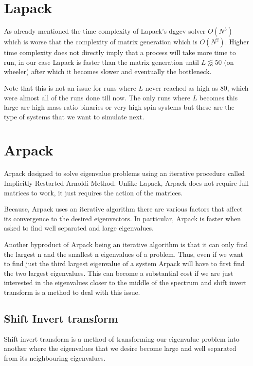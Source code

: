 \documentclass[%
 reprint,
 amsmath,amssymb,
 aps,
]{revtex4-2}
\begin{document}
\section{\label{sec:Lapack} Lapack}

As already mentioned the time complexity of Lapack's dggev solver $O(N^3)$ which is worse that the complexity of matrix generation which is $O(N^2)$. Higher time complexity does not directly imply that a process will take more time to run, in our case Lapack is faster than the matrix generation until $L \lessapprox 50$ (on wheeler) after which it becomes slower and eventually the bottleneck.

Note that this is not an issue for runs where $L$ never reached as high as 80, which were almost all of the runs done till now. The only runs where $L$ becomes this large are high mass ratio binaries or very high spin systems but these are the type of systems that we want to simulate next.

\section{\label{sec:Arpack} Arpack}

Arpack designed to solve eigenvalue problems using an iterative procedure called Implicitly Restarted Arnoldi Method. Unlike Lapack, Arpack does not require full matrices to work, it just requires the action of the matrices.

Because, Arpack uses an iterative algorithm there are various factors that affect its convergence to the desired eigenvectors. In particular, Arpack is faster when asked to find well separated and large eigenvalues. 

Another byproduct of Arpack being an iterative algorithm is that it can only find the largest n and the smallest n eigenvalues of a problem. Thus, even if we want to find just the third largest eigenvalue of a system Arpack will have to first find the two largest eigenvalues. This can become a substantial cost if we are just interested in the eigenvalues closer to the middle of the spectrum and shift invert transform is a method to deal with this issue.

\subsection{Shift Invert transform}

Shift invert transform is a method of transforming our eigenvalue problem into another where the eigenvalues that we desire become large and well separated from its neighbouring eigenvalues.
\end{document}
